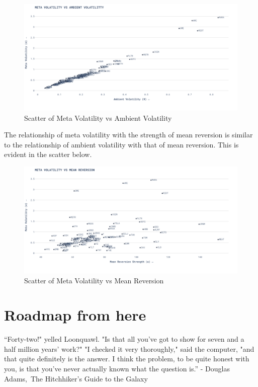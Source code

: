 \begin{figure}[H]
    \centering
    \includegraphics[width=\textwidth]{images/meta_volatility_vs_ambient_volatility.png}
    \caption{Scatter of Meta Volatility vs Ambient Volatility}
    \label{fig:figure_label}
\end{figure}

The relationship of meta volatility with the strength of mean reversion is similar to the relationship of ambient volatility with that of mean reversion. This is evident in the scatter below.

\begin{figure}[H]
    \centering
    \includegraphics[width=\textwidth]{images/meta_volatility_vs_mean_reversion.png}
    \caption{Scatter of Meta Volatility vs Mean Reversion}
    \label{fig:figure_label}
\end{figure}

\section{ Roadmap from here}

\begin{displayquote}

“Forty-two!" yelled Loonquawl. "Is that all you've got to show for seven and a half million years' work?"  "I checked it very thoroughly," said the computer, "and that quite definitely is the answer. I think the problem, to be quite honest with you, is that you've never actually known what the question is.”  - Douglas Adams, The Hitchhiker’s Guide to the Galaxy

\end{displayquote}

